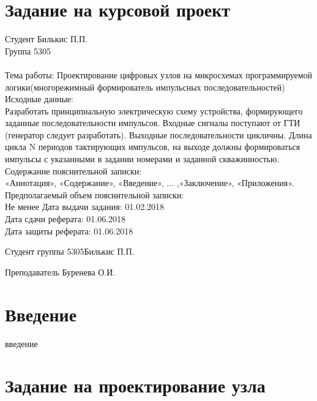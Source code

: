 \documentclass[a4paper,14pt,russian]{article}
\newcommand{\theme}{Проектирование цифровых узлов на микросхемах программируемой логики}
\newcommand{\groupnumber}{5305}
\newcommand{\studentname}{Билькис П.П.}
\newcommand{\teachername}{Буренева О.И.}
\begin{document}


\section*{Задание на курсовой проект}
Студент \studentname\\
Группа \groupnumber\\\\
Тема работы: \theme (многорежимный формирователь импульсных последовательностей) \\
Исходные данные:\\
Разработать принципиальную электрическую схему устройства, формирующего заданные последовательности импульсов. Входные сигналы поступают от ГТИ (генератор следует разработать). Выходные последовательности цикличны. Длина цикла N периодов тактирующих импульсов, на выходе должны формироваться импульсы с указанными в задании номерами и заданной скважинностью.
Содержание пояснительной записки:\\
«Аннотация», «Содержание», «Введение», ... ,«Заключение», «Приложения».
Предполагаемый объем пояснительной записки:\\
Не менее \pageref{LastPage}
Дата выдачи задания: 01.02.2018\\
Дата сдачи реферата: 01.06.2018\\
Дата защиты реферата: 01.06.2018\\

\vfill


Студент группы \groupnumber \hfill \studentname


Преподаватель \hfill \teachername


\clearpage

\begin{abstract}
  абстракт на русском
\end{abstract}


\begin{abstract}
  abstract here
\end{abstract}

\clearpage

\tableofcontents
\clearpage

\section*{Введение}
введение
\clearpage

\section{Задание на проектирование узла}
\end{document}
